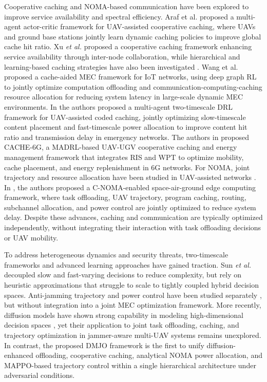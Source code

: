 \documentclass[journal]{IEEEtran}
\begin{document}
Cooperative caching and NOMA-based communication have 
been explored to improve service availability and 
spectral efficiency. Araf et al. \cite{araf2023uav} proposed a multi-agent actor-critic framework for UAV-assisted cooperative caching, where UAVs and ground base stations jointly learn dynamic caching policies to improve global cache hit ratio. Xu \textit{et al.} 
\cite{xu2026cooperative} proposed a cooperative caching 
framework enhancing service availability through 
inter-node collaboration, while hierarchical and 
learning-based caching strategies have also been 
investigated \cite{dhara2024cooperative, qi2024toward}. Wang et al. \cite{10044184} proposed a cache-aided MEC framework for IoT networks, using deep graph RL to jointly optimize computation offloading and communication-computing-caching resource allocation for reducing system latency in large-scale dynamic MEC environments. In \cite{10195210} the authors proposed a multi-agent two-timescale DRL framework for UAV-assisted coded caching, jointly optimizing slow-timescale content placement and fast-timescale power allocation to improve content hit ratio and transmission delay in emergency networks. The authors in \cite{11224006} proposed CACHE-6G, a MADRL-based UAV-UGV cooperative caching and energy management framework that integrates RIS and WPT to optimize mobility, cache placement, and energy replenishment in 6G networks. For NOMA, joint trajectory and resource allocation have been studied in UAV-assisted networks \cite{yin2025integrated, qin2024drl}. In \cite{10697399}, the authors proposed a C-NOMA-enabled space-air-ground edge computing framework, where task offloading, UAV trajectory, program caching, routing, subchannel allocation, and power control are jointly optimized to reduce system delay. Despite these advances, caching and communication are typically optimized independently, without integrating their interaction with task offloading decisions or UAV mobility.

To address heterogeneous dynamics and security threats, 
two-timescale frameworks and advanced learning approaches 
have gained traction. Sun \textit{et al.} \cite{TJCCT} 
decoupled slow and fast-varying decisions to reduce 
complexity, but rely on heuristic approximations that 
struggle to scale to tightly coupled hybrid decision 
spaces. Anti-jamming trajectory and power control have 
been studied separately \cite{wang2023uav, lv2023multi}, 
but without integration into a joint MEC optimization 
framework. More recently, diffusion models have shown 
strong capability in modeling high-dimensional decision 
spaces \cite{wang2026diffusion, liang2025uav}, yet their 
application to joint task offloading, caching, and 
trajectory optimization in jammer-aware multi-UAV 
systems remains unexplored. In contrast, the proposed 
DMJO framework is the first to unify diffusion-enhanced 
offloading, cooperative caching, analytical NOMA power 
allocation, and MAPPO-based trajectory control within 
a single hierarchical architecture under adversarial 
conditions.
\end{document}

